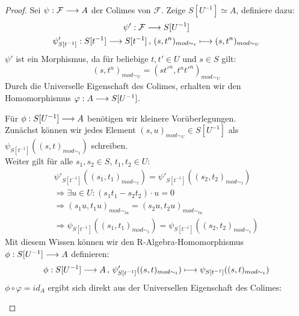 \documentclass[10pt,a4paper]{report}
\newcommand{\comment}[1]{}
\newcommand{\functionfront}[3]{\nolinebreak{#1:#2 \longrightarrow #3}}
\newcommand{\function}[5]{\nolinebreak{#1:#2 \longrightarrow #3 \, , \, #4 \longmapsto #5}}
\newcommand{\lok}[2]{#1 [#2^{-1}]}
\newcommand{\loke}[3]{(#1,#2)_{mod\sim_{#3}}}
\begin{document}
\begin{proof}
Sei $\functionfront{\psi}{\mathcal{F}}{A}$ der Colimes von $\mathcal{F}$. Zeige $\lok{S}{U} \simeq A$, definiere dazu:
\begin{gather*}
\functionfront{\psi'}{\mathcal{F}}{\lok{S}{U}}\\
\function{\psi'_{\lok{S}{t}}}{\lok{S}{t}}{\lok{S}{t}}{\loke{s}{t^n}{t}}{\loke{s}{t^n}{U}}
\end{gather*}
$\psi'$ ist ein Morphismus, da für beliebige $t,t' \in U$ und $s \in S$ gilt:
$$\loke{s}{t^n}{U} = \loke{st'^n}{t^nt'^n}{U}$$
Durch die Universelle Eigenschaft des Colimes, erhalten wir den Homomorphismus $\functionfront{\varphi}{A}{\lok{S}{U}}$.
\begin{center}
\end{center}
Für $\functionfront{\phi}{S[U^{-1}]}{A}$ benötigen wir kleinere Vorüberlegungen.\\
Zunächst können wir jedes Element $(s,u)_{mod\sim_{U}} \in \lok{S}{U}$ als $\psi_{\lok{S}{t}}(\loke{s}{t}{t})$ schreiben.\\
\comment{\label{wobei u = t}}
Weiter gilt für alle $s_1,s_2 \in S , \, t_1,t_2 \in U$: 
\begin{align*}
\psi'_{\lok{S}{t}}(\loke{s_1}{t_1}{t}) = \psi'_{\lok{S}{t}}(\loke{s_2}{t_2}{t})\\
\Rightarrow  \exists u \in U: (s_1t_1 - s_2t_2) \cdot u = 0\\
\Rightarrow  \loke{s_1u}{t_1u}{tu} = \loke{s_2u}{t_2u}{tu}\\
\Rightarrow  \psi_{\lok{S}{t}}(\loke{s_1}{t_1}{t}) = \psi_{\lok{S}{t}}(\loke{s_2}{t_2}{t})
\end{align*}
Mit diesem Wissen können wir den R-Algebra-Homomorphismus $\functionfront{\phi}{\lok{S}{U}}{A}$ definieren:
\begin{gather*}
\function{\phi}{\lok{S}{U}}{A}{\psi'_{\lok{S}{t}}(\loke{s}{t}{t})}{\psi_{\lok{S}{t}}(\loke{s}{t}{t})}
\end{gather*}
$\phi \circ \varphi = id_A$ ergibt sich direkt aus der Universellen Eigenschaft des Colimes:
\begin{center}
\begin{tikzcd}

\end{tikzcd}
\end{center}
\end{proof}
\end{document}
